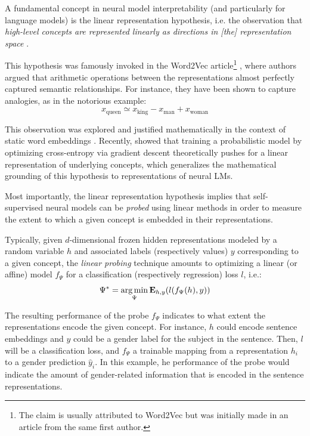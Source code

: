 A fundamental concept in neural model interpretability (and particularly for language models) is the linear representation hypothesis, i.e. the observation that \textit{high-level concepts are represented linearly as directions in [the] representation space} \citep{park2024the}.

This hypothesis was famously invoked in the Word2Vec article\footnote{The claim is usually attributed to Word2Vec but was initially made in an article from the same first author.} \citep{mikolov-etal-2013-linguistic}, where authors argued that arithmetic operations between the representations almost perfectly captured semantic relationships. For instance, they have been shown to capture analogies, as in the notorious example:
$$
x_{\text{queen}} \simeq x_{\text{king}} - x_{\text{man}} + x_{\text{woman}}
$$

This observation was explored and justified mathematically in the context of static word embeddings \citep{ethayarajh-etal-2019-towards, pmlr-v97-allen19a}. Recently, \citet{jiang2024on} showed that training a probabilistic model by optimizing cross-entropy via gradient descent theoretically pushes for a linear representation of underlying concepts, which generalizes the mathematical grounding of this hypothesis to representations of neural LMs. 

Most importantly, the linear representation hypothesis implies that self-supervised neural models can be \textit{probed} using linear methods in order to measure the extent to which a given concept is embedded in their representations. 

Typically, given $d$-dimensional frozen hidden representations modeled by a random variable $h$ and associated labels (respectively values) $y$ corresponding to a given concept, the \textit{linear probing} technique amounts to optimizing a linear (or affine) model $f_\Psi$ for a classification (respectively regression) loss $l$, i.e.:
$$
\Psi^* = \operatorname*{arg\,min}_{\Psi} \mathbf{E}_{h, y}(l(f_\Psi(h), y))
$$

The resulting performance of the probe $f_\Psi$ indicates to what extent the representations encode the given concept. For instance, $h$ could encode sentence embeddings and $y$ could be a gender label for the subject in the sentence. Then, $l$ will be a classification loss, and $f_\Psi$ a trainable mapping from a representation $h_i$ to a gender prediction $\hat{y}_i$. In this example, he performance of the probe would indicate the amount of gender-related information that is encoded in the sentence representations.

